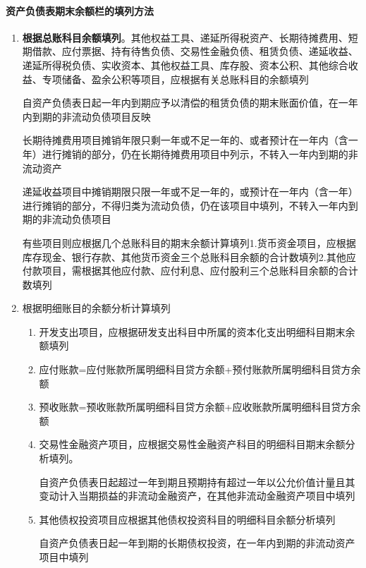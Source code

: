 \documentclass[UTF8,12pt]{ctexart}
\numberwithin{equation}{section} %
\numberwithin{figure}{section}
\numberwithin{table}{section}
\begin{document}
	\paragraph{资产负债表期末余额栏的填列方法}
	\begin{enumerate}
		\item \textbf{根据总账科目余额填列}。其他权益工具、递延所得税资产、长期待摊费用、短期借款、应付票据、持有待售负债、交易性金融负债、租赁负债、递延收益、递延所得税负债、实收资本、其他权益工具、库存股、资本公积、其他综合收益、专项储备、盈余公积等项目，应根据有关总账科目的余额填列
		
		自资产负债表日起一年内到期应予以清偿的租赁负债的期末账面价值，在一年内到期的非流动负债项目反映
		
		长期待摊费用项目摊销年限只剩一年或不足一年的、或者预计在一年内（含一年）进行摊销的部分，仍在长期待摊费用项目中列示，不转入一年内到期的非流动资产
		
		递延收益项目中摊销期限只限一年或不足一年的，或预计在一年内（含一年）进行摊销的部分，不得归类为流动负债，仍在该项目中填列，不转入一年内到期的非流动负债项目
		
		有些项目则应根据几个总账科目的期末余额计算填列1.货币资金项目，应根据库存现金、银行存款、其他货币资金三个总账科目余额的合计数填列2.其他应付款项目，需根据其他应付款、应付利息、应付股利三个总账科目余额的合计数填列
		
		\item 根据明细账目的余额分析计算填列
		\begin{enumerate}
			\item 开发支出项目，应根据研发支出科目中所属的资本化支出明细科目期末余额填列
			
			\item 应付账款=应付账款所属明细科目贷方余额+预付账款所属明细科目贷方余额
			
			\item 预收账款=预收账款所属明细科目贷方余额+应收账款所属明细科目贷方余额
			
			\item 交易性金融资产项目，应根据交易性金融资产科目的明细科目期末余额分析填列。
			
			自资产负债表日起超过一年到期且预期持有超过一年以公允价值计量且其变动计入当期损益的非流动金融资产，在其他非流动金融资产项目中填列
			
			\item 其他债权投资项目应根据其他债权投资科目的明细科目余额分析填列
			
			自资产负债表日起一年到期的长期债权投资，在一年内到期的非流动资产项目中填列
			

\end{enumerate}
\end{enumerate}
\end{document}

